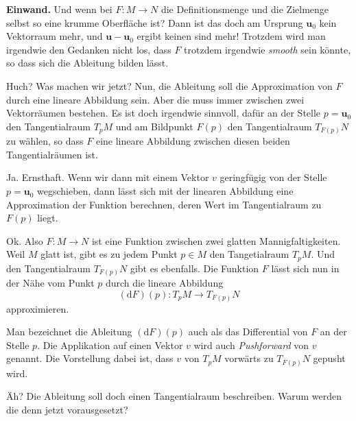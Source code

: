 \documentclass[9pt]{beamer}
\begin{document}
\begin{frame}
\textbf{Einwand.}
Und wenn bei $F\colon M\to N$ die Definitionsmenge und die Zielmenge
selbst so eine krumme Oberfläche ist? Dann ist das doch am Ursprung
$\mathbf u_0$ kein Vektorraum mehr, und $\mathbf u-\mathbf u_0$ ergibt
keinen sind mehr! Trotzdem wird man irgendwie den Gedanken nicht los,
dass $F$ trotzdem irgendwie \emph{smooth} sein könnte, so dass sich
die Ableitung bilden lässt.
\end{frame}

\begin{frame}
Huch? Was machen wir jetzt? Nun, die Ableitung soll die Approximation
von $F$ durch eine lineare Abbildung sein. Aber die muss immer
zwischen zwei Vektorräumen bestehen. Es ist doch irgendwie sinnvoll,
dafür an der Stelle $p=\mathbf u_0$ den Tangentialraum $T_p M$ und
am Bildpunkt $F(p)$ den Tangentialraum $T_{F(p)}N$ zu wählen,
so dass $F$ eine lineare Abbildung zwischen diesen beiden
Tangentialräumen ist.
\end{frame}

\begin{frame}
Ja. Ernsthaft. Wenn wir dann mit einem Vektor $v$ geringfügig von
der Stelle $p=\mathbf u_0$ wegschieben, dann lässt sich mit
der linearen Abbildung eine Approximation der Funktion berechnen,
deren Wert im Tangentialraum zu $F(p)$ liegt.
\end{frame}

\begin{frame}
Ok. Also $F\colon M\to N$ ist eine Funktion zwischen zwei
glatten Mannigfaltigkeiten. Weil $M$ glatt ist, gibt es zu jedem
Punkt $p\in M$ den Tangetialraum $T_p M$. Und den Tangentialraum
$T_{F(p)}N$ gibt es ebenfalls. Die Funktion $F$ lässt sich nun
in der Nähe vom Punkt $p$ durch die lineare Abbildung
\[(\mathrm dF)(p)\colon T_pM\to T_{F(p)}N\]
approximieren.
\end{frame}

\begin{frame}
Man bezeichnet die Ableitung $(\mathrm dF)(p)$ auch als das
Differential von $F$ an der Stelle $p$. Die Applikation auf einen
Vektor $v$ wird auch \emph{Pushforward} von $v$ genannt.
Die Vorstellung dabei ist, dass $v$
von $T_pM$ vorwärts zu $T_{F(p)}N$ gepusht wird.
\end{frame}

\begin{frame}
Äh? Die Ableitung soll doch einen Tangentialraum beschreiben.
Warum werden die denn jetzt vorausgesetzt?
\end{frame}
\end{document}
